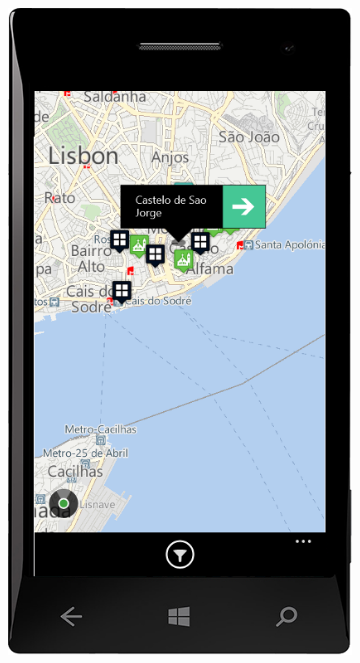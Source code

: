 \documentclass[a4paper]{book}
\begin{document}
\begin{figure}[H]
\begin{subfigure}{0.3\textwidth}
				\includegraphics[width=\textwidth]{screenshots/mobile/mobile10.png}
				\caption{\label{subfig:mobile_marker}}		
			\end{subfigure}
			\hfill
			\begin{subfigure}{0.3\textwidth}

\end{subfigure}
\end{figure}
\end{document}
